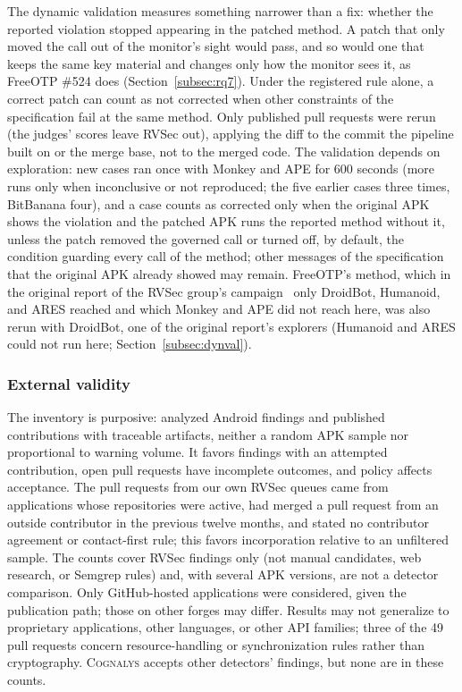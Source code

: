 \documentclass[conference]{IEEEtran}
\newcommand{\system}{\textsc{Cognalys}}
\begin{document}
The dynamic validation measures something narrower than a fix: whether the
reported violation stopped appearing in the patched method. A patch that only
moved the call out of the monitor's sight would pass, and so would one that
keeps the same key material and changes only how the monitor sees it, as
FreeOTP \#524 does (Section~\ref{subsec:rq7}). Under the registered rule alone, a correct patch can count as not corrected
when other constraints of the specification fail at the same method. Only published pull requests were rerun (the judges' scores
leave RVSec out), applying the diff to the commit the pipeline built on or the
merge base, not to the merged code. The validation depends on exploration: new
cases ran once with Monkey and APE for 600 seconds (more runs only when
inconclusive or not reproduced; the five earlier cases three times, BitBanana
four), and a case counts as corrected only when the original APK shows the
violation and the patched APK runs the reported method without it, unless the
patch removed the governed call or turned off, by default, the condition
guarding every call of the method; other messages of the specification that
the original APK already showed may remain.
FreeOTP's method, which in the original report of the RVSec group's
campaign~\cite{costa2026effectiveness} only DroidBot, Humanoid, and ARES
reached and which Monkey and APE did not reach here, was also rerun with
DroidBot, one of the original report's explorers (Humanoid and ARES could not run
here; Section~\ref{subsec:dynval}).

\subsubsection{External validity}

The inventory is purposive: analyzed Android findings and published
contributions with traceable artifacts, neither a random APK sample nor
proportional to warning volume. It favors findings with an attempted
contribution, open pull requests have incomplete outcomes, and policy affects
acceptance. The pull requests from our own RVSec queues came from applications
whose repositories were active, had merged a pull request from an outside
contributor in the previous twelve months, and stated no contributor agreement
or contact-first rule; this favors incorporation relative to an unfiltered
sample. The counts cover RVSec findings only (not manual candidates, web
research, or Semgrep rules) and, with several APK versions, are not a detector
comparison.
Only GitHub-hosted applications were considered,
given the publication path; those on other forges may differ. Results may not generalize to proprietary applications, other
languages, or other API families; three of the 49 pull requests concern
resource-handling or synchronization rules rather than cryptography.
\system{} accepts other detectors' findings, but none are in these counts.
\end{document}
